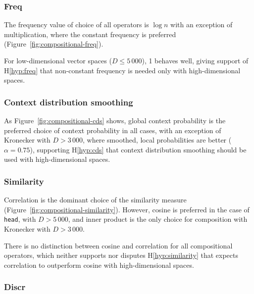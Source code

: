 

\subsubsection{Freq}
\label{sec:freq-compositional}

The frequency value of choice of all operators is $\log n$ with an exception of multiplication, where the constant frequency is preferred (Figure~\ref{fig:compositional-freq}).

For low-dimensional vector spaces ($D \leq 5\,000$), 1 behaves well, giving support of H\ref{hyp:freq} that non-constant frequency is needed only with high-dimensional spaces.

\subsubsection{Context distribution smoothing}
\label{sec:cont-distr-smooth-compositional}

As Figure~\ref{fig:compositional-cds} shows, global context probability is the preferred choice of context probability in all cases, with an exception of Kronecker with $D > 3\,000$, where smoothed, local probabilities are better ($\alpha = 0.75$), supporting H\ref{hyp:cds} that context distribution smoothing should be used with high-dimensional spaces.

\subsubsection{Similarity}
\label{sec:similarity-compositional}

Correlation is the dominant choice of the similarity measure (Figure~\ref{fig:compositional-similarity}). However, cosine is preferred in the case of \texttt{head}, with $D > 5\,000$, and inner product is the only choice for composition with Kronecker with $D > 3\,000$.

There is no distinction between cosine and correlation for all compositional operators, which neither supports nor disputes H\ref{hyp:similarity} that expects correlation to outperform cosine with high-dimensional spaces.

\subsubsection{Discr}
\label{sec:discr-compositional}



